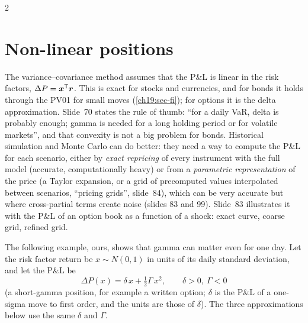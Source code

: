 \begin{paracol}{2}
\section{Non-linear positions}\label{ch19:sec-nl}
The variance--covariance method assumes that the P\&L is linear in the risk factors, $\Delta P=\bm x^{\mathsf T}\bm r$. This is exact for stocks and currencies, and for bonds it holds through the PV01 for small moves (\cref{ch19:sec-fi}); for options it is the delta approximation. Slide~70 states the rule of thumb: ``for a daily VaR, delta is probably enough; gamma is needed for a long holding period or for volatile markets'', and that convexity is not a big problem for bonds. Historical simulation and Monte Carlo can do better: they need a way to compute the P\&L for each scenario, either by \emph{exact repricing} of every instrument with the full model (accurate, computationally heavy) or from a \emph{parametric representation} of the price (a Taylor expansion, or a grid of precomputed values interpolated between scenarios, ``pricing grids'', slide~84), which can be very accurate but where cross-partial terms create noise (slides 83 and 99). Slide~83 illustrates it with the P\&L of an option book as a function of a shock: exact curve, coarse grid, refined grid.

The following example, ours, shows that gamma can matter even for one day. Let the risk factor return be $x\sim N(0,1)$ in units of its daily standard deviation, and let the P\&L be
\[
  \Delta P(x)=\delta\,x+\tfrac12\Gamma\,x^2,\qquad\delta>0,\ \Gamma<0
\]
(a short-gamma position, for example a written option; $\delta$ is the P\&L of a one-sigma move to first order, and the units are those of $\delta$). The three approximations below use the same $\delta$ and $\Gamma$.


\end{paracol}
